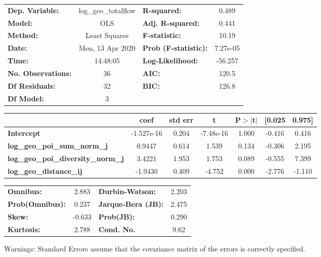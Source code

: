 \begin{center}
\begin{tabular}{lclc}
\toprule
\textbf{Dep. Variable:}                    & log\_geo\_totalflow & \textbf{  R-squared:         } &     0.489   \\
\textbf{Model:}                            &         OLS         & \textbf{  Adj. R-squared:    } &     0.441   \\
\textbf{Method:}                           &    Least Squares    & \textbf{  F-statistic:       } &     10.19   \\
\textbf{Date:}                             &   Mon, 13 Apr 2020  & \textbf{  Prob (F-statistic):} &  7.27e-05   \\
\textbf{Time:}                             &       14:48:05      & \textbf{  Log-Likelihood:    } &   -56.257   \\
\textbf{No. Observations:}                 &            36       & \textbf{  AIC:               } &     120.5   \\
\textbf{Df Residuals:}                     &            32       & \textbf{  BIC:               } &     126.8   \\
\textbf{Df Model:}                         &             3       & \textbf{                     } &             \\
\bottomrule
\end{tabular}
\begin{tabular}{lcccccc}
                                           & \textbf{coef} & \textbf{std err} & \textbf{t} & \textbf{P$> |$t$|$} & \textbf{[0.025} & \textbf{0.975]}  \\
\midrule
\textbf{Intercept}                         &   -1.527e-16  &        0.204     & -7.48e-16  &         1.000        &       -0.416    &        0.416     \\
\textbf{log\_geo\_poi\_sum\_norm\_j}       &       0.9447  &        0.614     &     1.539  &         0.134        &       -0.306    &        2.195     \\
\textbf{log\_geo\_poi\_diversity\_norm\_j} &       3.4221  &        1.953     &     1.753  &         0.089        &       -0.555    &        7.399     \\
\textbf{log\_geo\_distance\_ij}            &      -1.9430  &        0.409     &    -4.752  &         0.000        &       -2.776    &       -1.110     \\
\bottomrule
\end{tabular}
\begin{tabular}{lclc}
\textbf{Omnibus:}       &  2.883 & \textbf{  Durbin-Watson:     } &    2.203  \\
\textbf{Prob(Omnibus):} &  0.237 & \textbf{  Jarque-Bera (JB):  } &    2.475  \\
\textbf{Skew:}          & -0.633 & \textbf{  Prob(JB):          } &    0.290  \\
\textbf{Kurtosis:}      &  2.788 & \textbf{  Cond. No.          } &     9.62  \\
\bottomrule
\end{tabular}
\end{center}

Warnings: \newline
 [1] Standard Errors assume that the covariance matrix of the errors is correctly specified.